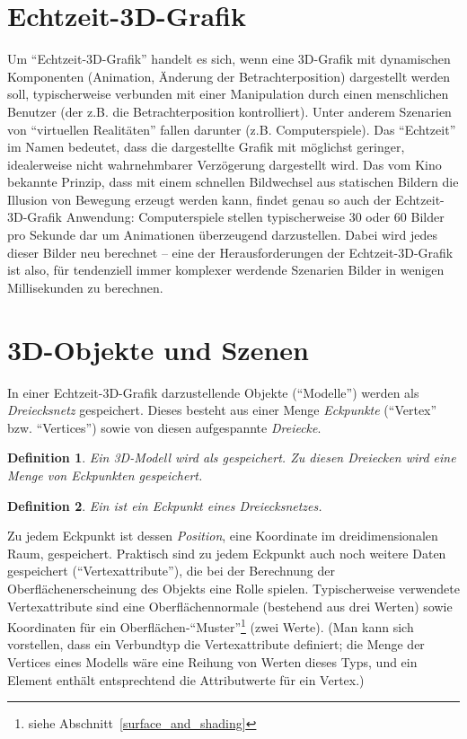 \documentclass[twoside,a4paper,fleqn,12pt]{book}
\newtheorem{defn}{Definition}
\begin{document}
\section{Echtzeit-3D-Grafik}

Um "`Echtzeit-3D-Grafik"' handelt es sich, wenn eine 3D-Grafik mit dynamischen Komponenten (Animation, Änderung der Betrachterposition)
dargestellt werden soll, typischerweise verbunden mit einer Manipulation durch einen menschlichen Benutzer
(der z.B. die Betrachterposition kontrolliert). Unter anderem Szenarien von "`virtuellen Realitäten"' fallen darunter (z.B. Computerspiele).
Das "`Echtzeit"' im Namen bedeutet, dass die dargestellte Grafik mit möglichst geringer, idealerweise nicht wahrnehmbarer
Verzögerung dargestellt wird. Das vom Kino bekannte Prinzip, dass mit einem schnellen Bildwechsel aus statischen Bildern die Illusion von Bewegung
erzeugt werden kann, findet genau so auch der Echtzeit-3D-Grafik Anwendung: Computerspiele stellen typischerweise 30 oder 60 Bilder
pro Sekunde dar um Animationen überzeugend darzustellen. Dabei wird jedes dieser Bilder neu berechnet --
eine der Herausforderungen der Echtzeit-3D-Grafik ist also, für tendenziell immer komplexer werdende Szenarien Bilder in wenigen
Millisekunden zu berechnen.

\section{3D-Objekte und Szenen}
\label{objects}

In einer Echtzeit-3D-Grafik darzustellende Objekte ("`Modelle"') werden als \emph{Dreiecksnetz} gespeichert.
Dieses besteht aus einer Menge \emph{Eckpunkte} (``Vertex'' bzw. ``Vertices'')
sowie von diesen aufgespannte \emph{Dreiecke}.

\begin{defn}
Ein \emph{3D-Modell} wird als  gespeichert.
Zu diesen Dreiecken wird eine Menge von \emph{Eckpunkten} gespeichert.
\end{defn}

\begin{defn}
Ein  ist ein Eckpunkt eines Dreiecksnetzes.
\end{defn}

Zu jedem Eckpunkt ist dessen \emph{Position}, eine Koordinate im dreidimensionalen Raum, gespeichert.
Praktisch sind zu jedem Eckpunkt auch noch weitere Daten gespeichert ("`Vertexattribute"'),
die bei der Berechnung der Oberflächenerscheinung des Objekts eine Rolle spielen.
Typischerweise verwendete Vertexattribute sind eine Oberflächennormale (bestehend aus drei Werten)
sowie Koordinaten für ein Oberflächen-"`Muster"'\footnote{siehe Abschnitt~\ref{surface_and_shading}} (zwei Werte).
(Man kann sich vorstellen, dass ein Verbundtyp die Vertexattribute definiert; die Menge der Vertices eines Modells wäre
eine Reihung von Werten dieses Typs, und ein Element enthält entsprechtend die Attributwerte für ein Vertex.)
\end{document}
